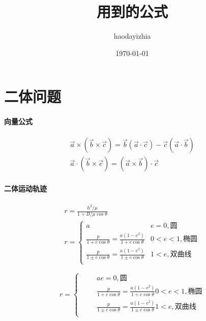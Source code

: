\documentclass[UTF8]{ctexart}
\title{用到的公式}
\author{haodayizhia}
\date{\today}
\begin{document}
\renewcommand\theequation{%
\thesection.\arabic{equation}}

\maketitle
\tableofcontents
\section{二体问题}
\paragraph{向量公式}
\begin{gather}
\vec{a}\times(\vec{b}\times\vec c) =\vec{b}(\vec{a}\cdot\vec{c})-\vec{c}(\vec{a}\cdot\vec{b})\\
\vec{a}\cdot(\vec{b}\times\vec{c})=(\vec{a}\times\vec{b})\cdot\vec{c}
\end{gather}
\paragraph{二体运动轨迹}
\begin{gather}
	r=\frac{h^2/\mu}{1+B/\mu\cos \theta}\\
	r=
	\begin{cases}
		a&e=0,\text{圆}\\
		\frac{p}{1+e\cos\theta}=\frac{a(1-e^2)}{1+e\cos\theta}&0<e<1,\text{椭圆}\\
		\frac{p}{1\pm e\cos\theta}=\frac{a(1-e^2)}{1\pm e\cos\theta}&1<e,\text{双曲线}\\
	\end{cases}
\end{gather}

\[ r=\left\{ \begin{aligned}
	&\mathrel{\phantom{=}}a e=0,\text{圆}\\
	&\mathrel{\phantom{=}}\frac{p}{1+e\cos\theta}=\frac{a(1-e^2)}{1+e\cos\theta} 0<e<1,\text{椭圆}\\
	&\mathrel{\phantom{=}}\frac{p}{1\pm e\cos\theta}=\frac{a(1-e^2)}{1\pm e\cos\theta} 1<e,\text{双曲线}\\
\end{aligned}
\right. \]

\end{document}
